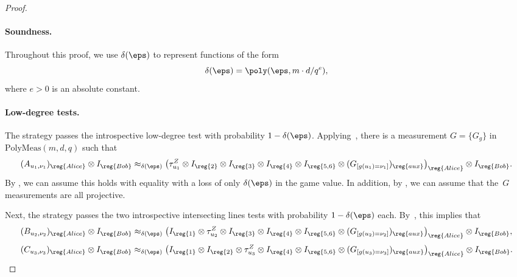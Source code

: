 \begin{proof}
\paragraph{Soundness.}
Throughout this proof, we use $\delta(\eps)$ to represent functions of the form
\begin{equation*}
\delta(\eps) = \poly(\eps, m \cdot d/q^e),
\end{equation*}
where $e > 0$ is an absolute constant.

\paragraph{Low-degree tests.}
The strategy passes the introspective low-degree test with probability $1-\delta(\eps)$.
Applying~, there is a measurement $G = \{G_g\}$ in $\mathrm{PolyMeas}(m, d, q)$ such that
\begin{equation*}
(A_{u_1, \nu_1})_{\reg{Alice}} \otimes I_{\reg{Bob}}
\approx_{\delta(\eps)}
\left(\tau^Z_{u_1} \otimes I_{\reg{2}} \otimes I_{\reg{3}} \otimes I_{\reg{4}} \otimes I_{\reg{5,6}} \otimes (G_{[g(u_1) = \nu_1]})_{\reg{aux}}\right)_{\reg{Alice}} \otimes I_{\reg{Bob}}.
\end{equation*}
By , we can assume this holds with equality
with a loss of only $\delta(\eps)$ in the game value.
In addition, by , we can assume that the~$G$ measurements are all projective.

Next, the strategy passes the two introspective intersecting lines tests with probability $1-\delta(\eps)$ each.
By~, this implies that
\begin{equation}\label{eq:whatevs}
(B_{u_2, \nu_2})_{\reg{Alice}} \otimes I_{\reg{Bob}}
\approx_{\delta(\eps)}
\left(I_{\reg{1}} \otimes \tau^Z_{u_2} \otimes I_{\reg{3}} \otimes I_{\reg{4}} \otimes I_{\reg{5,6}} \otimes (G_{[g(u_2) = \nu_2]})_{\reg{aux}}\right)_{\reg{Alice}} \otimes I_{\reg{Bob}},
\end{equation}
\begin{equation}\label{eq:whatevs-dos}
(C_{u_3, \nu_3})_{\reg{Alice}} \otimes I_{\reg{Bob}}
\approx_{\delta(\eps)}
\left(I_{\reg{1}} \otimes I_{\reg{2}} \otimes \tau^Z_{u_3} \otimes I_{\reg{4}} \otimes I_{\reg{5,6}} \otimes (G_{[g(u_3) = \nu_3]})_{\reg{aux}}\right)_{\reg{Alice}} \otimes I_{\reg{Bob}}.
\end{equation}


\end{proof}
